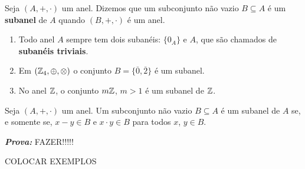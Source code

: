 \documentclass{beamer}
\begin{document}
    \begin{frame}
        \begin{definicao}
            Seja $(A, +, \cdot)$ um anel. Dizemos que um subconjunto n{\~a}o vazio $B\subseteq A$ {\'e} um \textbf{subanel} de $A$ quando $(B, +, \cdot)$ \'e um anel.
        \end{definicao}

        \begin{exemplos}
            \begin{enumerate}[label={\arabic*})]
                \item Todo anel $A$ sempre tem dois suban{\'e}is: $\{0_{A}\}$ e $A$, que s{\~a}o chamados de \textbf{suban{\'e}is triviais}.

                \vspace{.5cm}

                \item Em $(\mathbb{Z}_4,\oplus,\otimes)$ o conjunto $B = \{\overline{0}, \overline{2}\}$ \'e um subanel.

                \vspace{.5cm}
                
                \item No anel $\mathbb{Z}$, o conjunto $m\mathbb{Z}$, $m > 1$ {\'e} um subanel de $\mathbb{Z}$.

                \vspace{.5cm}
            \end{enumerate} 
        \end{exemplos}
    \end{frame}

    \begin{frame}
        \begin{proposicao}
            Seja $(A, +,\cdot)$ um anel. Um subconjunto n{\~a}o vazio $B\subseteq A$ {\'e} um subanel de $A$ se, e somente se, $x - y \in B$ e $x\cdot y \in B$ para todos $x$, $y \in B$.
        \end{proposicao}

        \noindent \textbf{\textit{Prova: }}FAZER!!!!!

        \begin{exemplos}
            COLOCAR EXEMPLOS
        \end{exemplos}
    \end{frame}
    
\end{document}
